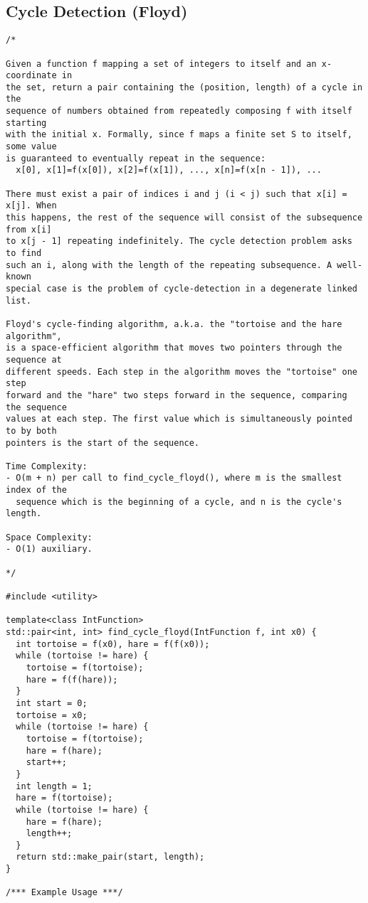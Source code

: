 \subsection{Cycle Detection (Floyd)}
\begin{lstlisting}
/*

Given a function f mapping a set of integers to itself and an x-coordinate in
the set, return a pair containing the (position, length) of a cycle in the
sequence of numbers obtained from repeatedly composing f with itself starting
with the initial x. Formally, since f maps a finite set S to itself, some value
is guaranteed to eventually repeat in the sequence:
  x[0], x[1]=f(x[0]), x[2]=f(x[1]), ..., x[n]=f(x[n - 1]), ...

There must exist a pair of indices i and j (i < j) such that x[i] = x[j]. When
this happens, the rest of the sequence will consist of the subsequence from x[i]
to x[j - 1] repeating indefinitely. The cycle detection problem asks to find
such an i, along with the length of the repeating subsequence. A well-known
special case is the problem of cycle-detection in a degenerate linked list.

Floyd's cycle-finding algorithm, a.k.a. the "tortoise and the hare algorithm",
is a space-efficient algorithm that moves two pointers through the sequence at
different speeds. Each step in the algorithm moves the "tortoise" one step
forward and the "hare" two steps forward in the sequence, comparing the sequence
values at each step. The first value which is simultaneously pointed to by both
pointers is the start of the sequence.

Time Complexity:
- O(m + n) per call to find_cycle_floyd(), where m is the smallest index of the
  sequence which is the beginning of a cycle, and n is the cycle's length.

Space Complexity:
- O(1) auxiliary.

*/

#include <utility>

template<class IntFunction>
std::pair<int, int> find_cycle_floyd(IntFunction f, int x0) {
  int tortoise = f(x0), hare = f(f(x0));
  while (tortoise != hare) {
    tortoise = f(tortoise);
    hare = f(f(hare));
  }
  int start = 0;
  tortoise = x0;
  while (tortoise != hare) {
    tortoise = f(tortoise);
    hare = f(hare);
    start++;
  }
  int length = 1;
  hare = f(tortoise);
  while (tortoise != hare) {
    hare = f(hare);
    length++;
  }
  return std::make_pair(start, length);
}

/*** Example Usage ***/


\end{lstlisting}
